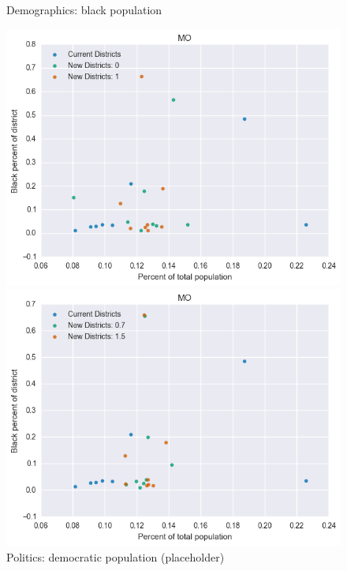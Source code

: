 \begin{figure}[htb!] \centering
\caption{ Demographics: black population }
\includegraphics[width=4.5in]{../analysis/MO/analysis_scatter.png}
\caption{ Politics: democratic population (placeholder)}
\includegraphics[width=4.5in]{../analysis/MO/analysis_scatter2.png}
\end{figure}

\clearpage
\newpage

